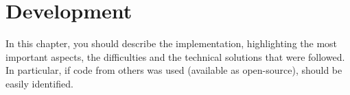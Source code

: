 \chapter{Development}\label{cap:development}

In this chapter, you should describe the implementation, highlighting the most important aspects, the difficulties and the technical solutions that were followed. In particular, if code from others was used (available as open-source), should be easily identified.
